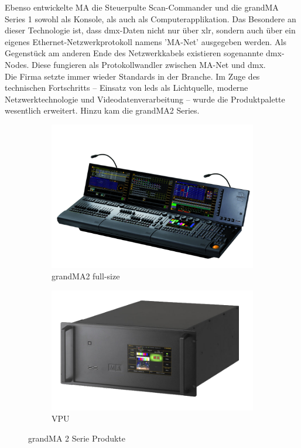 \documentclass[11pt]{scrartcl}
\begin{document}
\noindent
Ebenso entwickelte MA die Steuerpulte Scan-Commander und die grandMA Series 1 sowohl als
Konsole, als auch als Computerapplikation. Das Besondere an dieser Technologie ist, dass \ac{dmx}-Daten
nicht nur über \ac{xlr}, sondern auch über ein eigenes Ethernet-Netzwerkprotokoll namens 'MA-Net'
ausgegeben werden. Als Gegenstück am anderen Ende des Netzwerkkabels existieren sogenannte
\ac{dmx}-Nodes. Diese fungieren als Protokollwandler zwischen MA-Net und \ac{dmx}.\\
Die Firma setzte immer wieder Standards in der Branche. Im Zuge des technischen Fortschritts –
Einsatz von \ac{led}s als Lichtquelle, moderne Netzwerktechnologie und Videodatenverarbeitung –
wurde die Produktpalette wesentlich erweitert. Hinzu kam die grandMA2 Series.\\
\begin{figure}[H]
    \centering
    \begin{subfigure}[b]{0.45\textwidth}
        \includegraphics[width=\textwidth]{images/MA_grandMA2_full-size.png}
        \caption{grandMA2 full-size}
    \end{subfigure}
    \hfill 
    \begin{subfigure}[b]{0.4\textwidth}
        \includegraphics[width=\textwidth]{images/MA-VPU-plus_d.png}
        \caption{VPU}
    \end{subfigure}
    \caption{grandMA 2 Serie Produkte}\label{fig:gma2}
\end{figure}
\end{document}

